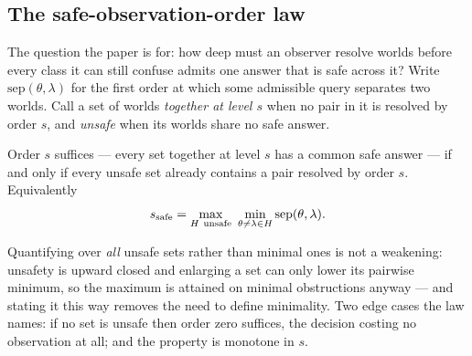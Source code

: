 

\subsection{The safe-observation-order law}
\label{sec:safelaw}

The question the paper is for: how deep must an observer resolve worlds before every class
it can still confuse admits one answer that is safe across it? Write $\mathrm{sep}(\theta,
\lambda)$ for the first order at which some admissible query separates two worlds. Call a
set of worlds \emph{together at level $s$} when no pair in it is resolved by order $s$, and
\emph{unsafe} when its worlds share no safe answer.

\begin{theorem}
\label{thm:safelaw}
Order $s$ suffices --- every set together at level $s$ has a common safe answer --- if and
only if every unsafe set already contains a pair resolved by order $s$. Equivalently
\[
s_{\rm safe}=\max_{H\ \text{unsafe}}\ \min_{\theta\ne\lambda\in H}\mathrm{sep}(\theta,\lambda).
\]
\end{theorem}

Quantifying over \emph{all} unsafe sets rather than minimal ones is not a weakening:
unsafety is upward closed and enlarging a set can only lower its pairwise minimum, so the
maximum is attained on minimal obstructions anyway --- and stating it this way removes the
need to define minimality. Two edge cases the law names: if no set is unsafe then order zero
suffices, the decision costing no observation at all; and the property is monotone in $s$.

